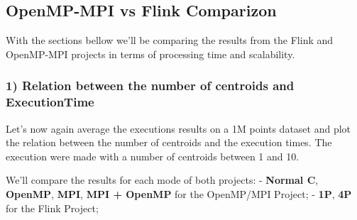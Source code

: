 \documentclass[11pt]{article}
\begin{document}
    \hypertarget{openmp-mpi-vs-flink-comparizon}{%
\subsection{OpenMP-MPI vs Flink
Comparizon}\label{openmp-mpi-vs-flink-comparizon}}

    With the sections bellow we'll be comparing the results from the Flink
and OpenMP-MPI projects in terms of processing time and scalability.

    \hypertarget{relation-between-the-number-of-centroids-and-executiontime}{%
\subsubsection{1) Relation between the number of centroids and
ExecutionTime}\label{relation-between-the-number-of-centroids-and-executiontime}}

    Let's now again average the executions results on a 1M points dataset
and plot the relation between the number of centroids and the execution
times. The execution were made with a number of centroids between 1 and
10.

We'll compare the results for each mode of both projects: -
\textbf{Normal C}, \textbf{OpenMP}, \textbf{MPI}, \textbf{MPI + OpenMP}
for the OpenMP/MPI Project; - \textbf{1P}, \textbf{4P} for the Flink
Project;
\end{document}

